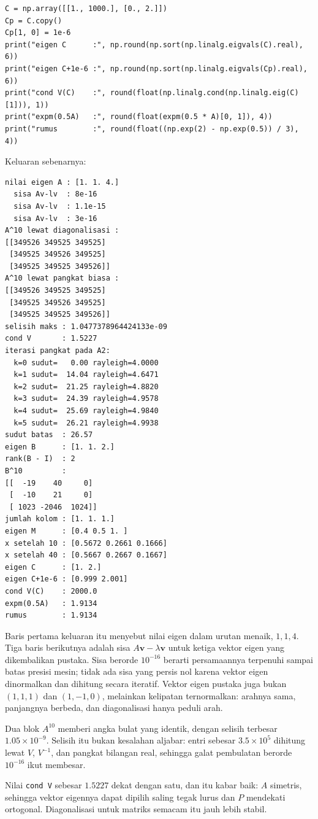 \begin{lab}
\begin{verbatim}
C = np.array([[1., 1000.], [0., 2.]])
Cp = C.copy()
Cp[1, 0] = 1e-6
print("eigen C      :", np.round(np.sort(np.linalg.eigvals(C).real), 6))
print("eigen C+1e-6 :", np.round(np.sort(np.linalg.eigvals(Cp).real), 6))
print("cond V(C)    :", round(float(np.linalg.cond(np.linalg.eig(C)[1])), 1))
print("expm(0.5A)   :", round(float(expm(0.5 * A)[0, 1]), 4))
print("rumus        :", round(float((np.exp(2) - np.exp(0.5)) / 3), 4))
\end{verbatim}
Keluaran sebenarnya:
\begin{verbatim}
nilai eigen A : [1. 1. 4.]
  sisa Av-lv  : 8e-16
  sisa Av-lv  : 1.1e-15
  sisa Av-lv  : 3e-16
A^10 lewat diagonalisasi :
[[349526 349525 349525]
 [349525 349526 349525]
 [349525 349525 349526]]
A^10 lewat pangkat biasa :
[[349526 349525 349525]
 [349525 349526 349525]
 [349525 349525 349526]]
selisih maks : 1.0477378964424133e-09
cond V       : 1.5227
iterasi pangkat pada A2:
  k=0 sudut=   0.00 rayleigh=4.0000
  k=1 sudut=  14.04 rayleigh=4.6471
  k=2 sudut=  21.25 rayleigh=4.8820
  k=3 sudut=  24.39 rayleigh=4.9578
  k=4 sudut=  25.69 rayleigh=4.9840
  k=5 sudut=  26.21 rayleigh=4.9938
sudut batas  : 26.57
eigen B      : [1. 1. 2.]
rank(B - I)  : 2
B^10         :
[[  -19    40     0]
 [  -10    21     0]
 [ 1023 -2046  1024]]
jumlah kolom : [1. 1. 1.]
eigen M      : [0.4 0.5 1. ]
x setelah 10 : [0.5672 0.2661 0.1666]
x setelah 40 : [0.5667 0.2667 0.1667]
eigen C      : [1. 2.]
eigen C+1e-6 : [0.999 2.001]
cond V(C)    : 2000.0
expm(0.5A)   : 1.9134
rumus        : 1.9134
\end{verbatim}
\end{lab}

Baris pertama keluaran itu menyebut nilai eigen dalam urutan menaik, $1,1,4$. Tiga baris
berikutnya adalah sisa $A\mathbf{v}-\lambda\mathbf{v}$ untuk ketiga vektor eigen yang dikembalikan
pustaka. Sisa berorde $10^{-16}$ berarti persamaannya terpenuhi sampai batas presisi mesin; tidak ada sisa
yang persis nol karena vektor eigen dinormalkan dan dihitung secara iteratif. Vektor eigen pustaka
juga bukan $(1,1,1)$ dan $(1,-1,0)$, melainkan kelipatan ternormalkan: arahnya sama, panjangnya
berbeda, dan diagonalisasi hanya peduli arah.

Dua blok $A^{10}$ memberi angka bulat yang identik, dengan selisih terbesar $1.05\times10^{-9}$.
Selisih itu bukan kesalahan aljabar: entri sebesar $3.5\times10^{5}$ dihitung lewat $V$, $V^{-1}$,
dan pangkat bilangan real, sehingga galat pembulatan berorde $10^{-16}$ ikut membesar.

Nilai \texttt{cond V} sebesar $1.5227$ dekat dengan satu, dan itu kabar baik: $A$ simetris,
sehingga vektor eigennya dapat dipilih saling tegak lurus dan $P$ mendekati ortogonal.
Diagonalisasi untuk matriks semacam itu jauh lebih stabil.

